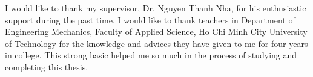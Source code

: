 \begin{acknowledgements}
    \addchaptertocentry{\acknowledgementname} %
    I would like to thank my supervisor, Dr. Nguyen Thanh Nha, for his enthusiastic support
during the past time. I would like to thank teachers in Department of Engineering
Mechanics, Faculty of Applied Science, Ho Chi Minh City University of Technology for
the knowledge and advices they have given to me for four years in college. This strong
basic helped me so much in the process of studying and completing this thesis.

    \end{acknowledgements}